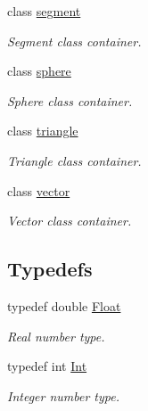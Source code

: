 \begin{DoxyCompactItemize}
class \hyperlink{classddd_1_1segment}{segment}
\begin{DoxyCompactList}\small\item\em Segment class container. \end{DoxyCompactList}\item 
class \hyperlink{classddd_1_1sphere}{sphere}
\begin{DoxyCompactList}\small\item\em Sphere class container. \end{DoxyCompactList}\item 
class \hyperlink{classddd_1_1triangle}{triangle}
\begin{DoxyCompactList}\small\item\em Triangle class container. \end{DoxyCompactList}\item 
class \hyperlink{classddd_1_1vector}{vector}
\begin{DoxyCompactList}\small\item\em Vector class container. \end{DoxyCompactList}\end{DoxyCompactItemize}
\subsection*{Typedefs}
\begin{DoxyCompactItemize}
\item 
\mbox{\label{namespaceddd_a900cde04ff126705e451a03e280e1c7a}} 
typedef double \hyperlink{namespaceddd_a900cde04ff126705e451a03e280e1c7a}{Float}
\begin{DoxyCompactList}\small\item\em Real number type. \end{DoxyCompactList}\item 
\mbox{\label{namespaceddd_a50ea76e2b817cc6c6b4539c7f3c4bdad}} 
typedef int \hyperlink{namespaceddd_a50ea76e2b817cc6c6b4539c7f3c4bdad}{Int}
\begin{DoxyCompactList}\small\item\em Integer number type. \end{DoxyCompactList}\end{DoxyCompactItemize}
